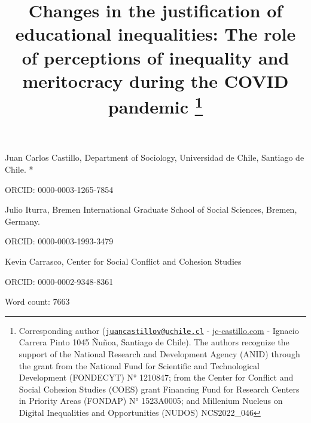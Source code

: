 \documentclass[
  12pt,
]{article}
\title{Changes in the justification of educational inequalities: The
role of perceptions of inequality and meritocracy during the COVID
pandemic \footnote{Corresponding author
  (\href{mailto:juancastillov@uchile.cl}{\nolinkurl{juancastillov@uchile.cl}}
  -
  \href{https://juancarloscastillo.github.io/jc-castillo/}{jc-castillo.com}
  - Ignacio Carrera Pinto 1045 Ñuñoa, Santiago de Chile). The authors
  recognize the support of the National Research and Development Agency
  (ANID) through the grant from the National Fund for Scientific and
  Technological Development (FONDECYT) N° 1210847; from the Center for
  Conflict and Social Cohesion Studies (COES) grant Financing Fund for
  Research Centers in Priority Areas (FONDAP) N° 1523A0005; and
  Millenium Nucleus on Digital Inequalities and Opportunities (NUDOS)
  NCS2022\_046}}
\author{}
\date{\vspace{-2.5em}}
\begin{document}
\maketitle

Juan Carlos Castillo, Department of Sociology, Universidad de Chile,
Santiago de Chile. *

ORCID: 0000-0003-1265-7854

Julio Iturra, Bremen International Graduate School of Social Sciences,
Bremen, Germany.

ORCID: 0000-0003-1993-3479

Kevin Carrasco, Center for Social Conflict and Cohesion Studies

ORCID: 0000-0002-9348-8361

Word count: 7663
\end{document}
